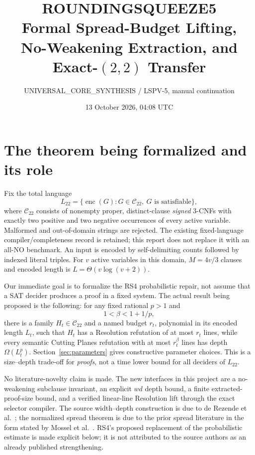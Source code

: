 \documentclass[11pt]{article}
\title{\textbf{ROUNDINGSQUEEZE5}\\[.35em]\Large Formal Spread-Budget Lifting,\\No-Weakening Extraction, and Exact-$(2,2)$ Transfer}
\author{UNIVERSAL\_CORE\_SYNTHESIS / LSPV-5, manual continuation}
\date{13 October 2026, 04:08 UTC}
\newcommand{\Cdom}{\mathcal C_{22}}
\begin{document}
\maketitle
\begin{center}
\end{center}

\section{The theorem being formalized and its role}
Fix the total language
\[
 L_{22}=\{\operatorname{enc}(G):G\in\Cdom,\ G\text{ is satisfiable}\},
\]
where $\Cdom$ consists of nonempty proper, distinct-clause \emph{signed}
3-CNFs with exactly two positive and two negative occurrences of every
active variable. Malformed and out-of-domain strings are rejected. The
existing fixed-language compiler/completeness record is retained; this
report does not replace it with an all-NO benchmark. An input is encoded by
self-delimiting counts followed by indexed literal triples. For $v$ active
variables in this domain, $M=4v/3$ clauses and encoded length is
$L=\Theta(v\log(v+2))$.

Our immediate goal is to formalize the RS4 probabilistic repair, not assume
that a SAT decider produces a proof in a fixed system. The actual result
being proposed is the following: for any fixed rational $p>1$ and
\[
                      1<\beta<1+1/p,                    \tag{1}
\]
there is a family $H_t\in\Cdom$ and a named budget $r_t$, polynomial in its
encoded length $L_t$, such that $H_t$ has a Resolution refutation of at most
$r_t$ lines, while every semantic Cutting Planes refutation with at most
$r_t^\beta$ lines has depth $\Omega(L_t^p)$. Section~\ref{sec:parameters}
gives constructive parameter choices. This is a size--depth trade-off for
\emph{proofs}, not a time lower bound for all deciders of $L_{22}$.

No literature-novelty claim is made. The new interfaces in this project are a no-weakening subclause invariant, an explicit
$wd$ depth bound, a finite extracted-proof-size bound, and a verified
linear-line Resolution lift through the exact selector compiler. The
source width--depth construction is due to de Rezende et al.~\cite{tradeoff};
the normalized spread theorem is due to the prior spread literature in the
form stated by Mossel et al.~\cite{spread}. RS4's proposed replacement of the
probabilistic estimate is made explicit below; it is not attributed to the
source authors as an already published strengthening.
\end{document}
